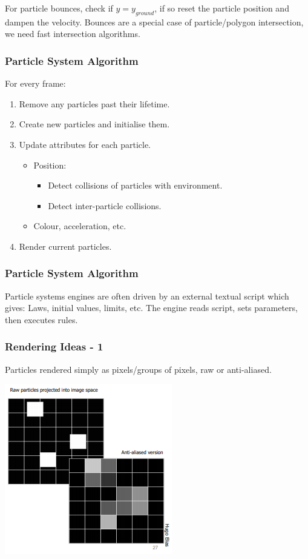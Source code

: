 \documentclass[11pt]{article}
\begin{document}
  For particle bounces, check if $y = y_{ground}$, if so reset the particle position and dampen the velocity. Bounces are a special case of particle/polygon intersection, we need fast intersection algorithms.\\


  \subsubsection{Particle System Algorithm}
  For every frame:
  \begin{enumerate}
    \item Remove any particles past their lifetime.
    \item Create new particles and initialise them.
    \item Update attributes for each particle.
    \begin{itemize}
      \item Position:
      \begin{itemize}
        \item Detect collisions of particles with environment.
        \item Detect inter-particle collisions.
      \end{itemize}
      \item Colour, acceleration, etc.
    \end{itemize}

    \item Render current particles.
  \end{enumerate}
  \subsubsection{Particle System Algorithm}

  Particle systems engines are often
  driven by an external textual script which gives: Laws, initial values, limits, etc. The engine reads script, sets parameters, then executes rules.
  \newpage
  \subsubsection{Rendering Ideas - 1}
  Particles rendered simply as pixels/groups of pixels, raw or anti-aliased.\\
  \begin{center}
    \includegraphics[scale=0.8]{render1}
  \end{center}
\end{document}
